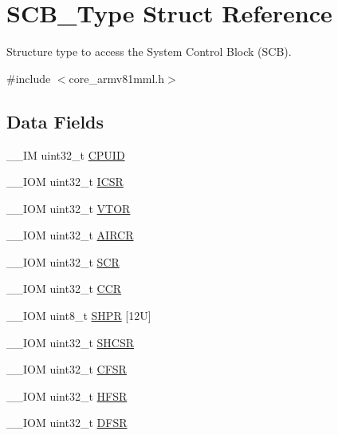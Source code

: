 \hypertarget{struct_s_c_b___type}{}\section{S\+C\+B\+\_\+\+Type Struct Reference}
\label{struct_s_c_b___type}


Structure type to access the System Control Block (S\+CB).  




{\ttfamily \#include $<$core\+\_\+armv81mml.\+h$>$}

\subsection*{Data Fields}
\begin{DoxyCompactItemize}
\item 
\+\_\+\+\_\+\+IM uint32\+\_\+t \mbox{\hyperlink{struct_s_c_b___type_adbf8292503748ba6421a523bdee6819d}{C\+P\+U\+ID}}
\item 
\+\_\+\+\_\+\+I\+OM uint32\+\_\+t \mbox{\hyperlink{struct_s_c_b___type_aced895d6aba03d72b0d865fcc5ce44ee}{I\+C\+SR}}
\item 
\+\_\+\+\_\+\+I\+OM uint32\+\_\+t \mbox{\hyperlink{struct_s_c_b___type_ae457d2615e203c3d5904a43a1bc9df71}{V\+T\+OR}}
\item 
\+\_\+\+\_\+\+I\+OM uint32\+\_\+t \mbox{\hyperlink{struct_s_c_b___type_a9b6ccd9c0c0865f8facad77ea37240b0}{A\+I\+R\+CR}}
\item 
\+\_\+\+\_\+\+I\+OM uint32\+\_\+t \mbox{\hyperlink{struct_s_c_b___type_acac65f229cb3fcb5369a0a9e0393b8c0}{S\+CR}}
\item 
\+\_\+\+\_\+\+I\+OM uint32\+\_\+t \mbox{\hyperlink{struct_s_c_b___type_ad68b5c1f2d9845ef4247cf2d9b041336}{C\+CR}}
\item 
\+\_\+\+\_\+\+I\+OM uint8\+\_\+t \mbox{\hyperlink{struct_s_c_b___type_a7ad5506df4709580091a9af0a9f6a28e}{S\+H\+PR}} \mbox{[}12\+U\mbox{]}
\item 
\+\_\+\+\_\+\+I\+OM uint32\+\_\+t \mbox{\hyperlink{struct_s_c_b___type_a44ad5c292dbd77e72f310902375a8a06}{S\+H\+C\+SR}}
\item 
\+\_\+\+\_\+\+I\+OM uint32\+\_\+t \mbox{\hyperlink{struct_s_c_b___type_a0f9e27357254e6e953a94f95bda040b1}{C\+F\+SR}}
\item 
\+\_\+\+\_\+\+I\+OM uint32\+\_\+t \mbox{\hyperlink{struct_s_c_b___type_ab974e7ceb2e52a3fbcaa84e06e52922d}{H\+F\+SR}}
\item 
\+\_\+\+\_\+\+I\+OM uint32\+\_\+t \mbox{\hyperlink{struct_s_c_b___type_a3b590075aa07880ce686d5cfb4e61c5c}{D\+F\+SR}}

\end{DoxyCompactItemize}
